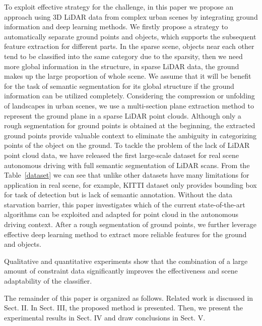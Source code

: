 \documentclass{sip}%
\begin{document}
To exploit effective strategy for the challenge, in this paper we propose an approach using 3D LiDAR data from complex urban scenes by integrating ground information and deep learning methods. 
We firstly propose a strategy to automatically separate ground points and objects, which supports the subsequent feature extraction for different parts. 
In the sparse scene, objects near each other tend to be classified into the same category due to the sparsity, then we need more global information in the structure, in sparse LiDAR data, the ground makes up the large proportion of whole scene. 
We assume that it will be benefit for the task of semantic segmentation for its global structure if the ground information can be utilized completely.
Considering the compression or unfolding of landscapes in urban scenes, we use a multi-section plane extraction method to represent the ground plane in a sparse LiDAR point clouds.
%
Although only a rough segmentation for ground points is obtained at the beginning, the extracted ground points provide valuable context to eliminate the ambiguity in categorizing points of the object on the ground. 
To tackle the problem of the lack of LiDAR point cloud data, we have released the first large-scale dataset for real scene autonomous driving with full semantic segmentation of LiDAR scans. 
From the Table~\ref{dataset} we can see that unlike other datasets have many limitations for application in real scene, for example, KITTI dataset only provides bounding box for task of detection but is lack of semantic annotation. 
Without the data starvation barrier, this paper investigates which of the current state-of-the-art algorithms can be exploited and adapted for point cloud in the autonomous driving context.
After a rough segmentation of ground points, we further leverage effective deep learning method to extract more reliable features for the ground and objects.   

Qualitative and quantitative experiments show that the combination of a large amount of constraint data significantly improves the effectiveness and scene adaptability of the classifier.

The remainder of this paper is organized as follows. Related work is discussed in Sect. II. In Sect. III, the proposed method is presented.
Then, we present the experimental results in Sect. IV and draw conclusions in Sect. V.
\end{document}
